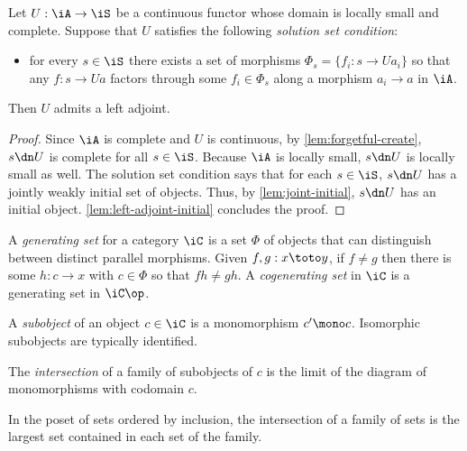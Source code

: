\documentclass{amsart}
\begin{document}
\begin{thm}
  Let $U : \iA \to \iS$ be a continuous functor whose domain is locally small and complete.
  Suppose that $U$ satisfies the following \emph{solution set condition}:
  \begin{itemize}
  \item for every $s \in \iS$ there exists a set of morphisms $\Phi_{s} = \{f_{i} : s \to Ua_{i}\}$ so that any $f : s \to Ua$ factors through some $f_{i} \in \Phi_{s}$ along a morphism $a_{i} \to a$ in $\iA$.
  \end{itemize}
  Then $U$ admits a left adjoint.
\end{thm}
\begin{proof}
  Since $\iA$ is complete and $U$ is continuous, by \cref{lem:forgetful-create}, $s \dn U$ is complete for all $s \in \iS$.
  Because $\iA$ is locally small, $s \dn U$ is locally small as well.
  The solution set condition says that for each $s \in \iS$, $s \dn U$ has a jointly weakly initial set of objects.
  Thus, by \cref{lem:joint-initial}, $s \dn U$ has an initial object.
  \cref{lem:left-adjoint-initial} concludes the proof.
\end{proof}

\begin{defn}
  A \emph{generating set} for a category $\iC$ is a set $\Phi$ of objects that can distinguish between distinct parallel morphisms.
  Given $f,g : x \toto y$, if $f \neq g$ then there is some $h : c \to x$ with $c \in \Phi$ so that $fh \neq gh$.
  A \emph{cogenerating set} in $\iC$ is a generating set in $\iC\op$.
\end{defn}

\begin{defn}
  A \emph{subobject} of an object $c \in \iC$ is a monomorphism $c' \mono c$.
  Isomorphic subobjects are typically identified.
\end{defn}

\begin{defn}
  The \emph{intersection} of a family of subobjects of $c$ is the limit of the diagram of monomorphisms with codomain $c$.
\end{defn}
In the poset of sets ordered by inclusion, the intersection of a family of sets is the largest set contained in each set of the family.
\end{document}
